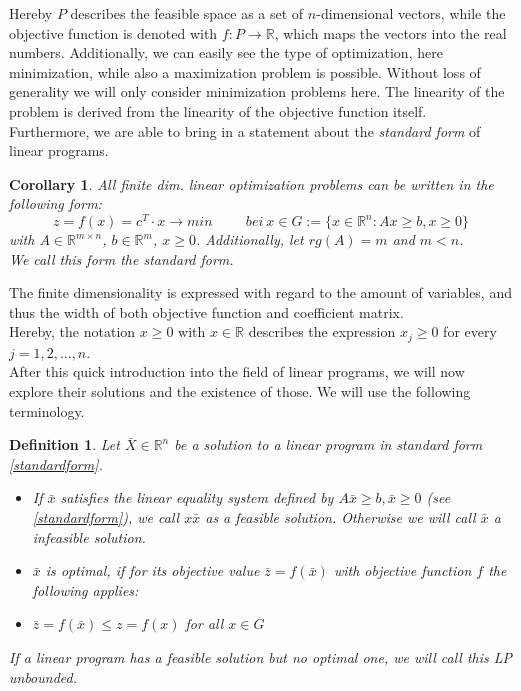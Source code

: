 \documentclass[a4paper, 11pt]{article}
\makeatletter
\newtheorem{mydef}{Definition}
\newtheorem{corollary}{Corollary}
\renewenvironment{quotation}
{\list{}{\listparindent=1.5em
		\itemindent=0pt
		\parsep\z@ \@plus\p@}%
	\item\relax}
{\endlist}
\makeatother
\begin{document}
Hereby $P$ describes the feasible space as a set of $n$-dimensional vectors, while the objective function is denoted with $f:P\rightarrow\mathbb{R}$, which maps the vectors into the real numbers. Additionally, we can easily see the type of optimization, here minimization, while also a maximization problem is possible. Without loss of generality we will only consider minimization problems here. The linearity of the problem is derived from the linearity of the objective function itself. \\

Furthermore, we are able to bring in a statement about the \textit{standard form} of linear programs. \\
\begin{corollary}
	All finite dim. linear optimization problems can be written in the following form:\\
	\begin{equation}
		\label{standardform}
		z = f(x) = c^T \cdot x \rightarrow min \hspace{1cm} bei\ x \in G:=\{x \in \mathbb{R}^n: Ax \geq b, x \geq 0\}
	\end{equation}
	with $A\in \mathbb{R}^{m\times n}$, $b\in\mathbb{R}^m$, $x\geq 0$. Additionally, let $rg(A)=m$ and $m< n$.\\
	We call this form the \textit{standard form}.
\end{corollary}
The finite dimensionality is expressed with regard to the amount of variables, and thus the width of both objective function and coefficient matrix. \\

Hereby, the notation $x\geq0$ with $x\in \mathbb{R}$ describes the expression $x_j\geq 0$ for every $j=1,2,\dots,n$.\\ 
After this quick introduction into the field of linear programs, we will now explore their solutions and the existence of those. We will use the following terminology.

\begin{mydef}
	Let $\bar{X} \in \mathbb{R}^n$ be a solution to a linear program in standard form \ref{standardform}.\\
	\begin{itemize}
		\item[(1)] If $\bar{x}$ satisfies the linear equality system defined by $A\bar{x}\geq b, \bar{x}\geq 0$ (see \ref{standardform}), we call $x\bar{x}$ as a \emph{feasible solution}. Otherwise we will call $\bar{x}$ a infeasible solution.
		\item[(2)] $\bar{x}$ is \emph{optimal}, if for its objective value $\bar{z} = f(\bar{x})$ with objective function $f$ the following applies:
		\begin{quotation}
			$\bar{z} = f(\bar{x}) \leq z = f(x)$ for all $x\in G$
		\end{quotation}
	\end{itemize}
	If a linear program has a feasible solution but no optimal one, we will call this LP unbounded.
\end{mydef}
\end{document}
